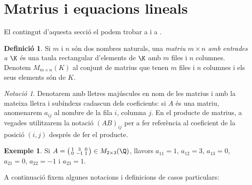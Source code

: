 \documentclass[a4paper,12pt,twoside]{article}
\newcommand{\1}{\mathbf{1}}
\newcommand{\0}{\mathbf{0}}
\theoremstyle{definition}
\newtheorem{definicio}[teorema]{Definició}
\newtheorem{exemple}[teorema]{Exemple}
\theoremstyle{remark}
\newtheorem{notacio}[teorema]{Notació}
\begin{document}
\section{Matrius i equacions lineals}
El contingut d'aquesta secció el podem trobar a \cite[Tema 1]{Bret} i a \cite[Tema 2]{NaXa}.
\begin{definicio}
	Si $m$ i $n$ són dos nombres naturals, una \emph{matriu $m\times n$ amb entrades a $\K$} és una taula rectangular d'elements de $\K$ amb $m$ files i $n$ columnes. Denotem $M_{m\times n}(K)$ al conjunt de matrius que tenen $m$ files i $n$ columnes i els seus elements són de $K$.
\end{definicio}
\begin{notacio}
	Denotarem amb lletres majúscules en nom de les matrius i amb la mateixa lletra i subíndexs cadascun dels coeficients: si $A$ és una matriu, anomenarem $a_{ij}$ al nombre de la fila $i$, columna $j$. En el producte de matrius, a vegades utilitzarem la notació $(AB)_{ij}$ per a fer referència al coeficient de la posició $(i,j)$ després de fer el producte.
\end{notacio}
\begin{exemple}
	Si $A=\big(\begin{smallmatrix}
	1 & 3 & 0 \\ 0 & -1 & 1
	\end{smallmatrix}\big) \in M_{2\times3}(\Q)$, llavors $a_{11}=1$, $a_{12}=3$, $a_{13}=0$, $a_{21}=0$, $a_{22}=-1$ i $a_{23}=1$.
\end{exemple}
A continuació fixem algunes notacions i definicions de casos particulars:
\end{document}

